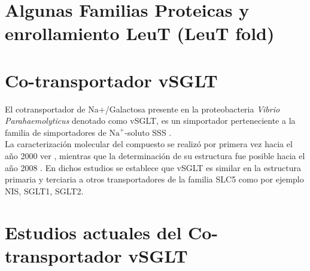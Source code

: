 \section{Algunas Familias Proteicas y enrollamiento LeuT (LeuT fold)}
\section{Co-transportador vSGLT}
El cotransportador de Na+/Galactosa presente en la proteobacteria \textit{Vibrio Parahaemolyticus } denotado como vSGLT, es un simportador perteneciente a la familia de simportadores de $\mathrm{Na}^+$-soluto SSS \cite{SaierJr.quotTheFamilyquot}.\\
La caracterizaci\'{o}n molecular del compuesto se realiz\'{o} por primera vez hacia el a\~{n}o 2000 ver \cite{Turk2000}, mientras que la determinaci\'{o}n de su estructura fue posible hacia el a\~{n}o 2008 \cite{Faham2008}. En dichos estudios se establece que vSGLT es similar en la estructura primaria y terciaria a otros transportadores de la familia SLC5 como por ejemplo NIS, SGLT1, SGLT2.
\section{Estudios actuales del Co-transportador vSGLT}
